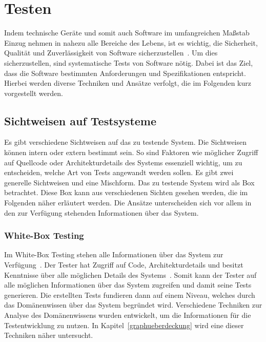\newpage
\section{Testen}
\label{test}

Indem technische Geräte und somit auch Software im umfangreichen Maßstab Einzug nehmen in nahezu alle Bereiche des
Lebens, ist es wichtig, die Sicherheit, Qualität und Zuverlässigkeit von Software sicherzustellen~\cite[vgl. Introduction]{software-testing}.
Um dies sicherzustellen, sind systematische Tests von Software nötig.
Dabei ist das Ziel, dass die Software bestimmten Anforderungen und Spezifikationen entspricht.
Hierbei werden diverse Techniken und Ansätze verfolgt, die im Folgenden kurz vorgestellt werden.

\subsection{Sichtweisen auf Testsysteme}

Es gibt verschiedene Sichtweisen auf das zu testende System.
Die Sichtweisen können intern oder extern bestimmt sein.
So sind Faktoren wie möglicher Zugriff auf Quellcode oder Architekturdetails des Systems essenziell wichtig, um zu entscheiden, welche Art von Tests angewandt werden sollen.
Es gibt zwei generelle Sichtweisen und eine Mischform.
Das zu testende System wird als Box betrachtet.
Diese Box kann aus verschiedenen Sichten gesehen werden, die im Folgenden näher erläutert werden.
Die Ansätze unterscheiden sich vor allem in den zur Verfügung stehenden Informationen über das System.

\subsubsection{White-Box Testing}

Im White-Box Testing stehen alle Informationen über das System zur Verfügung~\cite[vgl. 1.4.2 Code-Based Testing]{software-testing-craftmans}.
Der Tester hat Zugriff auf Code, Architekturdetails und besitzt Kenntnisse über alle möglichen Details des Systems~\cite[vgl. 1.4.2 Code-Based Testing]{software-testing-craftmans}.
Somit kann der Tester auf alle möglichen Informationen über das System zugreifen und damit seine Tests generieren.
Die erstellten Tests fundieren dann auf einem Niveau, welches durch das Domänenwissen über das System begründet wird.
Verschiedene Techniken zur Analyse des Domänenwissens wurden entwickelt, um die Informationen für die Testentwicklung zu nutzen.
In Kapitel~\ref{graphueberdeckung} wird eine dieser Techniken näher untersucht.


